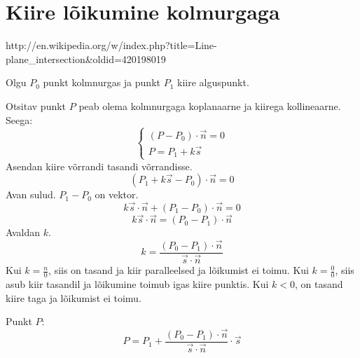 \documentclass[12pt,a4paper]{report}
\begin{document}
  \section{Kiire lõikumine kolmurgaga}
  http://en.wikipedia.org/w/index.php?title=Line-plane_intersection&oldid=420198019
  
  Olgu \(P_0\) punkt kolmnurgas ja punkt \(P_1\) kiire alguspunkt.
   
  Otsitav punkt \(P\) peab olema kolmnurgaga koplanaarne ja kiirega
  kollineaarne. Seega:
  \[\left\{\begin{array}{l}
      (P-P_0)\cdot\vec n = 0\\
      P=P_1+k\vec s
    \end{array}\right.\]
  Asendan kiire võrrandi tasandi võrrandisse.
  \[(P_1+k\vec s-P_0)\cdot\vec n = 0\]
  Avan sulud. \(P_1-P_0\) on vektor.
  \[k\vec s\cdot\vec n+(P_1-P_0)\cdot\vec n = 0\]
  \[k\vec s\cdot\vec n = (P_0-P_1)\cdot\vec n\]
  Avaldan \(k\).
  \[k=\frac{(P_0-P_1)\cdot\vec n}{\vec s\cdot\vec n}\]
  Kui \(k = \frac n0\), siis on tasand ja kiir paralleelsed ja lõikumist ei
  toimu. Kui \(k = \frac00\), siis asub kiir tasandil ja lõikumine toimub igas
  kiire punktis. Kui \(k < 0\), on tasand kiire taga ja lõikumist ei toimu.
  
  Punkt \(P\):
  \[P=P_1+\frac{(P_0-P_1)\cdot\vec n}{\vec s\cdot\vec n}\cdot\vec s\]
  
\end{document}
